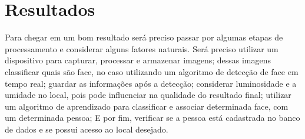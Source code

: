 
\chapter{Resultados}\label{cap:resultados}

Para chegar em um bom resultado será preciso passar por algumas etapas de 
processamento e considerar alguns fatores naturais. Será preciso utilizar 
um dispositivo para capturar, processar e armazenar imagens; dessas imagens 
classificar quais são face, no caso utilizando um algoritmo de detecção de 
face em tempo real; guardar as informações após a detecção; considerar 
luminosidade e a umidade no local, pois pode influenciar na qualidade do 
resultado final; utilizar um algoritmo de aprendizado para classificar e 
associar determinada face, com um determinada pessoa; E por fim, verificar 
se a pessoa está cadastrada no banco de dados e se possui acesso ao 
local desejado.